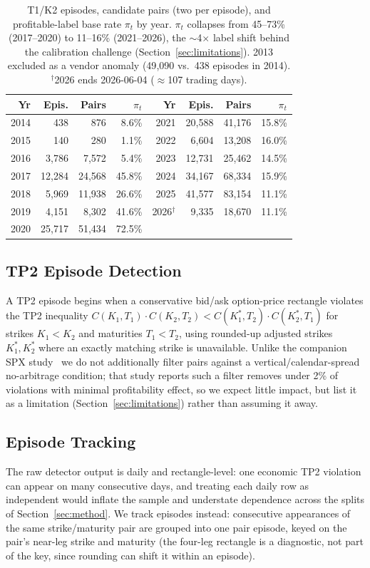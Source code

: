 \documentclass[sigconf,review,anonymous]{acmart}
\begin{document}
\begin{table}[t]
\centering
\footnotesize
\begin{tabular}{rrrr@{\hskip 1.4em}rrrr}
\toprule
Yr & Epis. & Pairs & $\pi_t$ & Yr & Epis. & Pairs & $\pi_t$ \\
\midrule
2014 & 438 & 876 & 8.6\% & 2021 & 20{,}588 & 41{,}176 & 15.8\% \\
2015 & 140 & 280 & 1.1\% & 2022 & 6{,}604 & 13{,}208 & 16.0\% \\
2016 & 3{,}786 & 7{,}572 & 5.4\% & 2023 & 12{,}731 & 25{,}462 & 14.5\% \\
2017 & 12{,}284 & 24{,}568 & 45.8\% & 2024 & 34{,}167 & 68{,}334 & 15.9\% \\
2018 & 5{,}969 & 11{,}938 & 26.6\% & 2025 & 41{,}577 & 83{,}154 & 11.1\% \\
2019 & 4{,}151 & 8{,}302 & 41.6\% & 2026$^\dagger$ & 9{,}335 & 18{,}670 & 11.1\% \\
2020 & 25{,}717 & 51{,}434 & 72.5\% & & & & \\
\bottomrule
\end{tabular}
\caption{T1/K2 episodes, candidate pairs (two per episode), and profitable-label base rate $\pi_t$ by year. $\pi_t$ collapses from 45--73\% (2017--2020) to 11--16\% (2021--2026), the $\sim$4$\times$ label shift behind the calibration challenge (Section~\ref{sec:limitations}). 2013 excluded as a vendor anomaly (49{,}090 vs.\ 438 episodes in 2014). $^\dagger$2026 ends 2026-06-04 ($\approx$107 trading days).}
\label{tab:peryear}
\end{table}

\subsection{TP2 Episode Detection}
A TP2 episode begins when a conservative bid/ask option-price rectangle violates the TP2 inequality $C(K_1,T_1)\cdot C(K_2,T_2) < C(K_1^{\ast},T_2)\cdot C(K_2^{\ast},T_1)$ for strikes $K_1 < K_2$ and maturities $T_1 < T_2$, using rounded-up adjusted strikes $K_1^{\ast}, K_2^{\ast}$ where an exactly matching strike is unavailable. Unlike the companion SPX study~\cite{glasserman2025tp2} we do not additionally filter pairs against a vertical/calendar-spread no-arbitrage condition; that study reports such a filter removes under 2\% of violations with minimal profitability effect, so we expect little impact, but list it as a limitation (Section~\ref{sec:limitations}) rather than assuming it away.

\subsection{Episode Tracking}
\label{sec:episode-tracking}
The raw detector output is daily and rectangle-level: one economic TP2 violation can appear on many consecutive days, and treating each daily row as independent would inflate the sample and understate dependence across the splits of Section~\ref{sec:method}. We track episodes instead: consecutive appearances of the same strike/maturity pair are grouped into one pair episode, keyed on the pair's near-leg strike and maturity (the four-leg rectangle is a diagnostic, not part of the key, since rounding can shift it within an episode).
\end{document}
